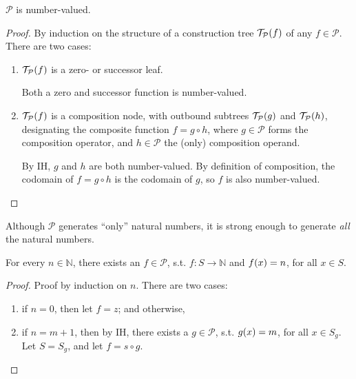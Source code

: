 \begin{theorem} \label{thm:p-number-valued} $\mathcal{P}$ is number-valued.
\end{theorem}

\begin{proof} By induction on the structure of a construction tree
$\mathcal{T}_\mathcal{P}{\mathopen{}\left({f}\right)\mathclose{}}$ of any $f\in \mathcal{P}$. There are two
cases:\begin{enumerate}[label=(\arabic*)]

\item $\mathcal{T}_\mathcal{P}{\mathopen{}\left({f}\right)\mathclose{}}$ is a zero- or successor leaf.

Both a zero and successor function is number-valued.

\item $\mathcal{T}_\mathcal{P}{\mathopen{}\left({f}\right)\mathclose{}}$ is a composition node, with outbound
subtrees $\mathcal{T}_\mathcal{P}{\mathopen{}\left({g}\right)\mathclose{}}$ and $\mathcal{T}_\mathcal{P}{\mathopen{}\left({h}\right)\mathclose{}}$,
designating the composite function $f = g \circ h$, where $g \in \mathcal{P}$
forms the composition operator, and $h \in \mathcal{P}$ the (only) composition
operand.

By IH, $g$ and $h$ are both number-valued. By definition of composition, the
codomain of $f = g \circ h$ is the codomain of $g$, so $f$ is also
number-valued.\end{enumerate}\end{proof}

Although $\mathcal{P}$ generates ``only'' natural numbers, it is strong enough
to generate \emph{all} the natural numbers.

\begin{theorem} \label{thm:p-generates-all-N} For every $n \in \mathbb{N}$,
there exists an $f \in \mathcal{P}$, s.t. $f : S \rightarrow \mathbb{N}$ and
$f{\mathopen{}\left({x}\right)\mathclose{}} = n$, for all $x \in S$. \end{theorem}

\begin{proof} Proof by induction on $n$. There are two cases:

\begin{enumerate}[label=(\arabic*)]

\item if $n = 0$, then let $f = z$; and otherwise,

\item if $n = m + 1$, then by IH, there exists a $g \in \mathcal{P}$, s.t.
$g{\mathopen{}\left({x}\right)\mathclose{}} = m$, for all $x \in S_g$. Let $S=S_g$, and let $f = s \circ g$.
\end{enumerate} \end{proof}

